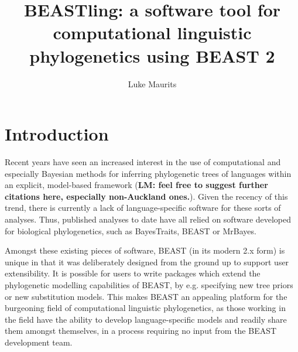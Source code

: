 \documentclass[twocolumn,10pt]{scrartcl}
\begin{document}
\title{BEASTling: a software tool for computational linguistic phylogenetics using BEAST 2}
\author{Luke Maurits}
\maketitle


\section{Introduction}

Recent years have seen an increased interest in the use of computational and especially Bayesian methods for inferring phylogenetic trees of languages within an explicit, model-based framework \citep[e.g.,][]{Gray2003,Gray2009,Bouckaert2012} (\textbf{LM: feel free to suggest further citations here, especially non-Auckland ones.}).  Given the recency of this trend, there is currently a lack of language-specific software for these sorts of analyses.  Thus, published analyses to date have all relied on software developed for biological phylogenetics, such as BayesTraits, BEAST\cite{Drummond2012,Bouckaert2014} or MrBayes\cite{Huelsenbeck2001, Ronquist2003}.

Amongst these existing pieces of software, BEAST (in its modern 2.x form) is unique in that it was deliberately designed from the ground up to support user extensibility.  It is possible for users to write packages which extend the phylogenetic modelling capabilities of BEAST, by e.g. specifying new tree priors or new substitution models.  This makes BEAST an appealing platform for the burgeoning field of computational linguistic phylogenetics, as those working in the field have the ability to develop language-specific models and readily share them amongst themselves, in a process requiring no input from the BEAST development team.
\end{document}
